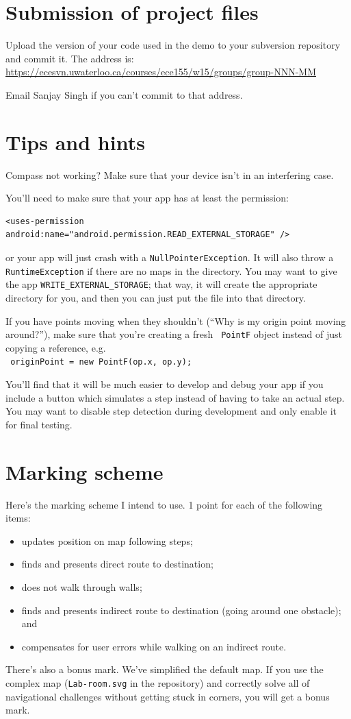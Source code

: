 \documentclass[10pt]{article}
\begin{document}
\section{Submission of project files}

Upload the version of your code used in the demo to your subversion repository and commit it. The address is:
\url{https://ecesvn.uwaterloo.ca/courses/ece155/w15/groups/group-NNN-MM}

Email Sanjay Singh if you can't commit to that address.

\section{Tips and hints} 
Compass not working? Make sure that your device isn't in an interfering case.

You'll need to make sure that your app has at least the permission:
\begin{lstlisting}
<uses-permission android:name="android.permission.READ_EXTERNAL_STORAGE" />
\end{lstlisting}
or your app will just crash with a {\tt NullPointerException}. It will also throw a {\tt RuntimeException} if there are no maps in the directory. You may want
to give the app {\tt WRITE\_EXTERNAL\_STORAGE}; that way, it will create 
the appropriate directory for you, and then you can just put the file into that
directory.

If you have points moving when they shouldn't (``Why is my origin
point moving around?''), make sure that you're creating a fresh {\tt
  PointF} object instead of just copying a reference, e.g.  \\ {\tt
  originPoint = new PointF(op.x, op.y); }



You'll find that it will be much easier to develop and
debug your app if you include a button which simulates a step instead
of having to take an actual step. You may want to disable step
detection during development and only enable it for final testing.

\section{Marking scheme} Here's the marking scheme I intend to use. 1 point for each of the following items:
\begin{itemize}
\item updates position on map following steps;
\item finds and presents direct route to destination;
\item does not walk through walls;
\item finds and presents indirect route to destination (going around one obstacle); and
\item compensates for user errors while walking on an indirect route.
\end{itemize}
There's also a bonus mark. We've simplified the default map. If you
use the complex map ({\tt Lab-room.svg} in the repository)
and correctly solve all of navigational challenges without getting
stuck in corners, you will get a bonus mark.
\end{document}
